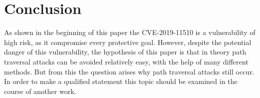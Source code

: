
\section{Conclusion}

As shown in the beginning of this paper the CVE-2019-11510 is a vulnerability of high risk, as it compromise every protective goal. However, despite the potential danger of this vulnerability, the hypothesis of this paper is that in theory path traversal attacks can be avoided relatively easy, with the help of many different methods. But from this the question arises why path traversal attacks still occur. In order to make a qualified statement this topic should be examined in the course of another work.




